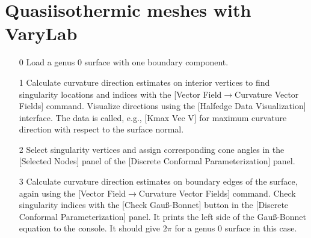 \documentclass[Thesis.tex]{subfiles}
\begin{document}
\section{Quasiisothermic meshes with {\sc VaryLab}}
\label{sec:quasiisothermic_varylab}


\begin{itemize}
\item[0] Load a genus $0$ surface with one boundary component.
\item[1] Calculate curvature direction estimates on interior vertices to find singularity locations and indices with the [Vector Field$\to$Curvature Vector Fields] command. Visualize directions using the [Halfedge Data Visualization] interface. The data is called, e.g., [Kmax Vec V] for maximum curvature direction with respect to the surface normal.
\item[2] Select singularity vertices and assign corresponding cone angles in the [Selected Nodes] panel of the [Discrete Conformal Parameterization] panel.
\item[3] Calculate curvature direction estimates on boundary edges of the surface, again using the [Vector Field$\to$Curvature Vector Fields] command. Check singularity indices with the [Check Gau{\ss}-Bonnet] button in the [Discrete Conformal Parameterization] panel. It prints the left side of the Gau{\ss}-Bonnet equation to the console. It should give $2\pi$ for a genus $0$ surface in this case.

\begin{center}
\begin{minipage}{0.9\linewidth}
            \centering
\end{minipage}
\end{center}     
            

\end{itemize}
\end{document}
